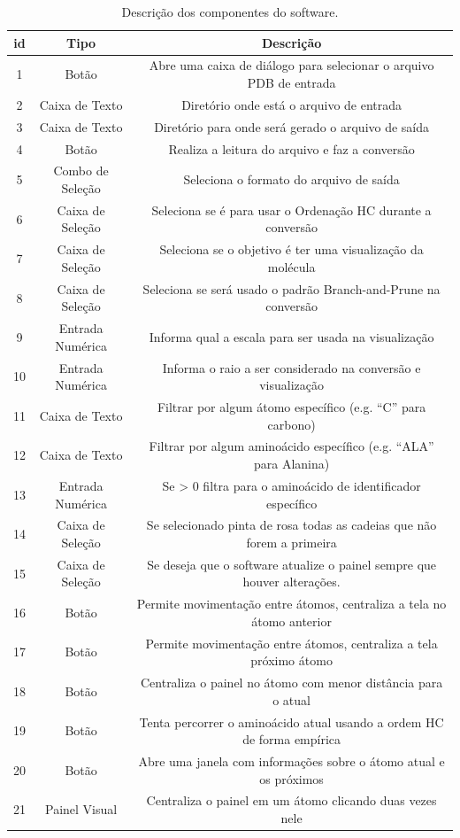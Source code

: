 \documentclass[a4paper,12pt]{article}
\begin{document}
	\begin{table}[H]
		\hspace{-2cm}
		\begin{tabular}{ |c|c|c| } 
			\hline
			\textbf{id} & \textbf{Tipo} & \textbf{Descrição} \\
			\hline
			1 & Botão & Abre uma caixa de diálogo para selecionar o arquivo PDB de entrada \\\hline
			2 & Caixa de Texto & Diretório onde está o arquivo de entrada \\ \hline
			3 & Caixa de Texto & Diretório para onde será gerado o arquivo de saída\\\hline
			4 & Botão & Realiza a leitura do arquivo e faz a conversão\\\hline
			5 & Combo de Seleção & Seleciona o formato do arquivo de saída \\\hline
			6 & Caixa de Seleção & Seleciona se é para usar o Ordenação HC durante a conversão \\ \hline
			7 & Caixa de Seleção & Seleciona se o objetivo é ter uma visualização da molécula\\ \hline
			8 & Caixa de Seleção & Seleciona se será usado o padrão Branch-and-Prune na conversão\\ \hline
			9 & Entrada Numérica & Informa qual a escala para ser usada na visualização\\ \hline
			10 & Entrada Numérica & Informa o raio a ser considerado na conversão e visualização\\ \hline
			11 & Caixa de Texto & Filtrar por algum átomo específico (e.g. ``C'' para carbono)\\ \hline
			12 & Caixa de Texto & Filtrar por algum aminoácido específico (e.g. ``ALA'' para Alanina)\\ \hline
			13 & Entrada Numérica & Se > 0 filtra para o aminoácido de identificador específico\\ \hline
			14 & Caixa de Seleção & Se selecionado pinta de rosa todas as cadeias que não forem a primeira\\ \hline
			15 & Caixa de Seleção & Se deseja que o software atualize o painel sempre que houver alterações.\\ \hline
			16 & Botão & Permite movimentação entre átomos, centraliza a tela no átomo anterior\\ \hline
			17 & Botão & Permite movimentação entre átomos, centraliza a tela próximo átomo\\ \hline
			18 & Botão & Centraliza o painel no átomo com menor distância para o atual\\ \hline
			19 & Botão & Tenta percorrer o aminoácido atual usando a ordem HC de forma empírica\\ \hline
			20 & Botão & Abre uma janela com informações sobre o átomo atual e os próximos\\ \hline
			21 & Painel Visual & Centraliza o painel em um átomo clicando duas vezes nele\\\hline
		\end{tabular}
		\caption{Descrição dos componentes do software.}
		\label{table:pdbreader}
	\end{table}
\end{document}
